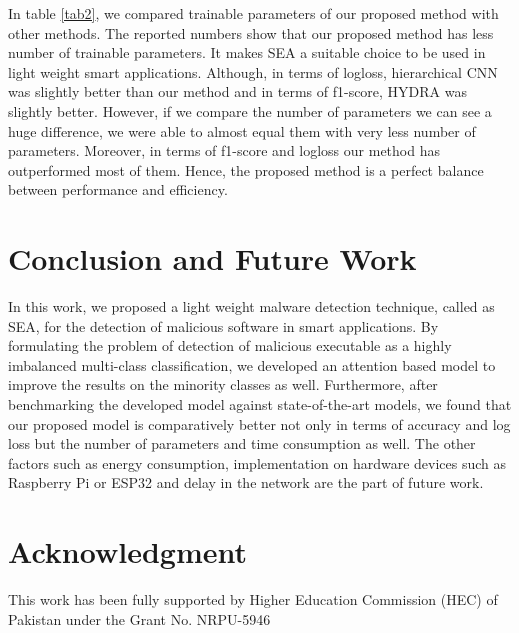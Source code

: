 \documentclass[conference]{IEEEtran}
\begin{document}
In table \ref{tab2}, we compared trainable parameters of our proposed method with other methods. The reported numbers show that our proposed method has less number of trainable parameters. It makes SEA a suitable choice to be used in light weight smart applications. Although, in terms of logloss, hierarchical CNN was slightly better than our method and in terms of f1-score, HYDRA was slightly better. However, if we compare the number of parameters we can see a huge difference, we were able to almost equal them with very less number of parameters. Moreover, in terms of f1-score and logloss our method has outperformed most of them. Hence, the proposed method is a perfect balance between performance and efficiency.

\section{Conclusion and Future Work}
In this work, we proposed a light weight malware detection technique, called as SEA, for the detection of malicious software in smart applications. By formulating the problem of detection of malicious executable as a highly imbalanced multi-class classification, we developed an attention based model to improve the results on the minority classes as well.
Furthermore, after benchmarking the developed model against state-of-the-art models, we found that our proposed model is comparatively better not only in terms of accuracy and log loss but the number of parameters and time consumption as well. The other factors such as energy consumption, implementation on hardware devices such as Raspberry Pi or ESP32 and delay in the network are the part of future work. 

\section*{Acknowledgment}
This work has been fully supported by Higher Education Commission (HEC) of Pakistan under the Grant No. NRPU-5946
\end{document}
